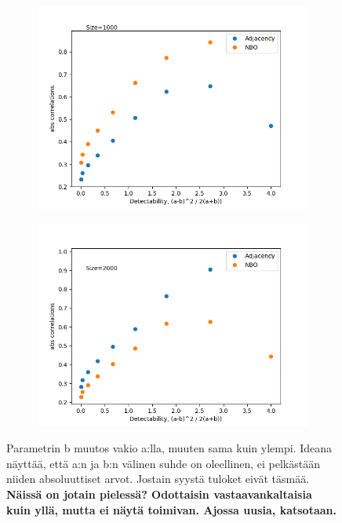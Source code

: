 \documentclass[finnish,12pt,a4paper,pdftex,sci,utf8]{aaltothesis}
\begin{document}
\begin{figure}
	\centering
	\begin{subfigure}[b]{0.45 \textwidth}
		\includegraphics[width = \textwidth]{detectability_b_1.png}
	\end{subfigure}
	\begin{subfigure}[b]{0.45 \textwidth}
		\includegraphics[width = \textwidth]{detectability_b_2.png}
	\end{subfigure}
	\caption{Parametrin b muutos vakio a:lla, muuten sama kuin ylempi. Ideana näyttää, että a:n ja b:n välinen suhde on oleellinen, ei pelkästään niiden absoluuttiset arvot. Jostain syystä tuloket eivät täsmää. \textbf{Näissä on jotain pielessä? Odottaisin vastaavankaltaisia kuin yllä, mutta ei näytä toimivan. Ajossa uusia, katsotaan.}}
	\label{fig:b_param}
\end{figure}
\end{document}
